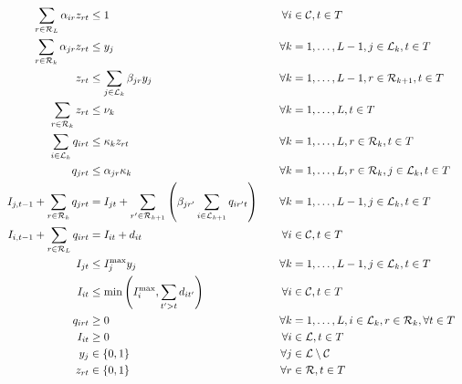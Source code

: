 \documentclass[a4paper,10pt]{article}
\begin{document}
\begin{linenumbers}
    \begin{alignat}{3}
&&\sum_{r\in \mathcal{R}_L} \alpha_{ir} z_{rt} &\leq 1 						&\forall i&\in \mathcal{C}, t \in T  					\label{const:singleroutecustomers}\\
&&\sum_{r\in \mathcal{R}_k} \alpha_{jr} z_{rt} &\leq y_j 					&\forall k&=1,\ldots,L-1, j\in \mathcal{L}_k, t \in T  \label{const:singleroutedc}\\
&&z_{rt} 					&\leq \sum_{j\in\mathcal{L}_{k}}\beta_{jr}y_j 	&\forall k&=1,\ldots,L-1,r\in \mathcal{R}_{k+1}, t \in T \label{const:startfromopendepots}\\
&&\sum_{r\in \mathcal{R}_k} z_{rt} &\leq 	\nu_k							&\forall k&=1,\ldots,L, t \in T  				\label{const:fleetcapa}\\
&&\sum_{i\in \mathcal{L}_k} q_{irt}   		&\leq \kappa_k z_{rt} 			&\forall k&=1,\ldots,L,  r\in \mathcal{R}_k, t \in T 	\label{const:deliveryUB}\\
&&q_{jrt}   		&\leq \alpha_{jr}\kappa_k  						&\forall k&=1,\ldots,L,  r\in \mathcal{R}_k, j \in \mathcal{L}_k, t \in T	\label{const:deliveryConstLoc}\\
&&I_{j,t-1} + \sum_{r\in\mathcal{R}_k} q_{jrt} 			&=I_{jt} +\sum_{r'\in \mathcal{R}_{k+1}}\left(\beta_{jr'} \sum_{i\in \mathcal{L}_{k+1}}q_{ir't}\right)\quad 			
   																	&\forall k&=1,\ldots,L-1, j\in \mathcal{L}_k, t \in T 				\label{const:invflowdepots}\\
&&I_{i,t-1}+\sum_{r\in \mathcal{R}_L} q_{irt} &= I_{it} +d_{it} 			&\forall i&\in \mathcal{C},  t \in T					\label{const:invflowcustomers}\\
&&I_{jt}	&\leq I_j^{\max} y_j  									&\forall k&=1,\ldots,L-1,  j\in \mathcal{L}_k, t \in T \label{const:invdepotUB}\\	
&&I_{it} 	&\leq \min\left(I_i^{\max}, \sum_{t' > t}d_{it'}\right)	&\forall i&\in \mathcal{C},  t \in T					\label{const:invcustUB}\\
&&q_{irt}			&\geq 0 										&\forall k&=1,\ldots,L,  i\in \mathcal{L}_k,  r\in \mathcal{R}_k,\forall t \in T	\label{const:upos}	\\
&&I_{it}			&\geq 0 										&\forall i &\in \mathcal{L},  t \in T					\label{const:invCpos}	\\
&&y_{j}				& \in \{0,1\} 								&\forall j&\in \mathcal{L}\setminus\mathcal{C}						\label{const:ybool}\\	
&&z_{rt}			&\in \{0,1\} 									&\forall r&\in \mathcal{R},  t \in T					\label{const:zbool}
\end{alignat}



\end{linenumbers}
\end{document}
